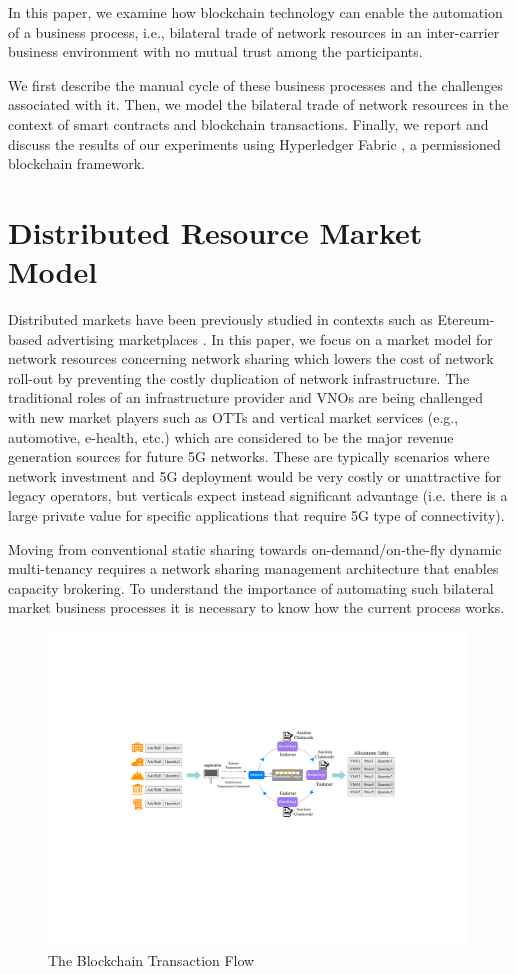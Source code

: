 \documentclass[conference]{IEEEtran}
\begin{document}
In this paper, we examine how blockchain technology can enable the automation of a business process, i.e., bilateral trade of network resources in an inter-carrier business environment with no mutual trust among the participants.

We first describe the manual cycle of these business processes and the challenges associated with it. Then, we model the bilateral trade of network resources in the context of smart contracts and blockchain transactions. Finally, we report and discuss the results of our experiments using Hyperledger Fabric \cite{Fabric}, a permissioned blockchain framework.


\section{Distributed Resource Market Model}
Distributed markets have been previously studied in contexts such as Etereum-based advertising marketplaces \cite{Ranganthan2018ADM}. In this paper, we focus on a market model for network resources concerning
network sharing which lowers the cost of network roll-out by preventing the costly duplication of network infrastructure. The traditional roles of an infrastructure provider and VNOs are being challenged with new market players such as OTTs and vertical market services (e.g., automotive, e-health, etc.) which are considered to be the major revenue generation sources for future 5G networks.
These are typically scenarios where network investment and 5G deployment would be very costly or unattractive for legacy operators, but verticals expect instead significant advantage (i.e. there is a large private value for specific applications that require 5G type of connectivity).

Moving from conventional static sharing towards on-demand/on-the-fly dynamic multi-tenancy \cite{7514161} requires a network sharing management architecture that enables capacity brokering. To understand the importance of automating such bilateral market business processes it is necessary to know how the current process works.

\begin{figure}
    \centering
    \includegraphics[width=0.99\textwidth]{figs/f-wide.pdf}
    \caption{The Blockchain Transaction Flow}
    \label{fig:flow}
\end{figure}
\end{document}
